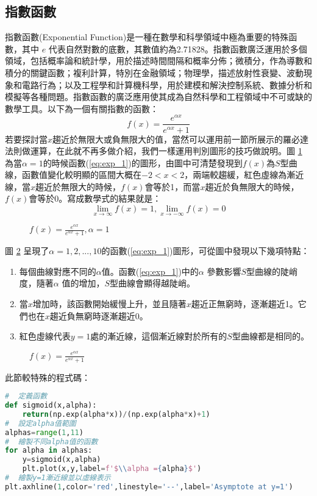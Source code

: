 \subsection{指數函數}
指數函數(Exponential Function)是一種在數學和科學領域中極為重要的特殊函數，其中 $e$ 代表自然對數的底數，其數值約為2.71828。指數函數廣泛運用於多個領域，包括概率論和統計學，用於描述時間間隔和概率分佈；微積分，作為導數和積分的關鍵函數；複利計算，特別在金融領域；物理學，描述放射性衰變、波動現象和電路行為；以及工程學和計算機科學，用於建模和解決控制系統、數據分析和模擬等各種問題。指數函數的廣泛應用使其成為自然科學和工程領域中不可或缺的數學工具。以下為一個有關指數的函數：
\begin{equation}\label{eq:exp_1}
f(x)=\frac{{e^{{\alpha x}}}}{{e^{{\alpha x}}+1}}
\end{equation}
若要探討當$x$趨近於無限大或負無限大的值，當然可以運用前一節所展示的羅必達法則做運算，在此就不再多做介紹，我們一樣運用判別圖形的技巧做說明。圖 \ref{fig:exp_1} 為當$\alpha =1$的時候函數(\ref{eq:exp_1})的圖形，由圖中可清楚發現到$f(x)$為$S$型曲線，函數值變化較明顯的區間大概在$-2 < x < 2$，兩端較趨緩，紅色虛線為漸近線，當$x$趨近於無限大的時候，$f(x)$會等於1，而當$x$趨近於負無限大的時候，$f(x)$會等於0。寫成數學式的結果就是：
$$\lim_{x \rightarrow \infty}f(x)=1,\lim_{x \rightarrow -\infty}f(x)=0$$
\begin{figure}[H]
    \caption{$f(x)=\frac{{e^{{\alpha x}}}}{{e^{{\alpha x}}+1}},\alpha=1$}
    \label{fig:exp_1}
\end{figure}
圖 \ref{fig:exp_2} 呈現了$\alpha =1,2,...,10$的函數(\ref{eq:exp_1})圖形，可從圖中發現以下幾項特點：
\begin{enumerate}
\item 每個曲線對應不同的$\alpha$值。函數(\ref{eq:exp_1})中的$\alpha$ 參數影響$S$型曲線的陡峭度，隨著$\alpha$ 值的增加，$S$型曲線會顯得越陡峭。
\item 當$x$增加時，該函數開始緩慢上升，並且隨著$x$趨近正無窮時，逐漸趨近1。它們也在$x$趨近負無窮時逐漸趨近0。
\item 紅色虛線代表$y=1$處的漸近線，這個漸近線對於所有的$S$型曲線都是相同的。
\end{enumerate}
\begin{figure}[h]
    \caption{$f(x)=\frac{{e^{{\alpha x}}}}{{e^{{\alpha x}}+1}}$}
    \label{fig:exp_2}
\end{figure}
此節較特殊的程式碼：
\begin{lstlisting}[language=Python]
#  定義函數
def sigmoid(x,alpha):
    return(np.exp(alpha*x))/(np.exp(alpha*x)+1)
#  設定alpha值範圍
alphas=range(1,11)
#  繪製不同alpha值的函數
for alpha in alphas:
    y=sigmoid(x,alpha)
    plt.plot(x,y,label=f'$\\alpha ={alpha}$')
#  繪製y=1漸近線並以虛線表示
plt.axhline(1,color='red',linestyle='--',label='Asymptote at y=1')
\end{lstlisting}
